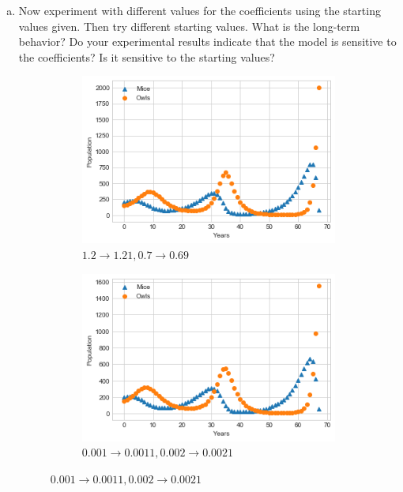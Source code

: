 \documentclass[10pt]{report}
\begin{document}
\begin{enumerate}
\begin{enumerate}[a.]
		\item 
		Now experiment with different values for the coefficients using the starting values given. Then try different starting values. What is the long-term behavior? Do your experimental results indicate that the model is sensitive to the coefficients? Is it sensitive to the starting values?
		
		\begin{figure}[H]
			\centering
			\begin{subfigure}[b]{.5\linewidth}
				\caption{$1.2 \to 1.21, 0.7 \to 0.69$}
				\includegraphics[width=\linewidth]{s1_4/4c1.png}
			\end{subfigure}%
			\begin{subfigure}[b]{.5\linewidth}
				\caption{$0.001 \to 0.0011, 0.002 \to 0.0021$}
				\includegraphics[width=\linewidth]{s1_4/4c2.png}
			\end{subfigure}
		\end{figure}

\end{enumerate}
\end{enumerate}
\end{document}

